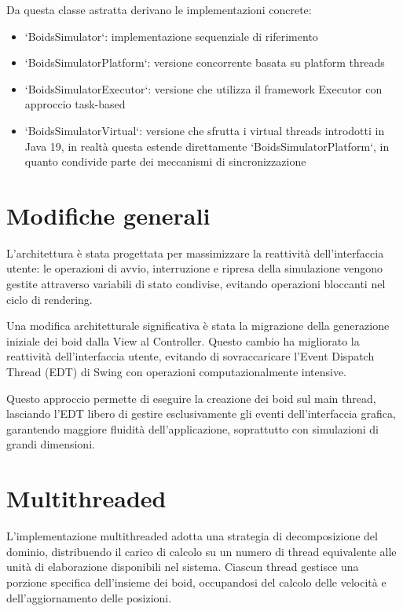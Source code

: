 \documentclass[a4paper,12pt]{report}
\begin{document}
Da questa classe astratta derivano le implementazioni concrete:
\begin{itemize}
    \item `BoidsSimulator`: implementazione sequenziale di riferimento
    \item `BoidsSimulatorPlatform`: versione concorrente basata su platform threads
    \item `BoidsSimulatorExecutor`: versione che utilizza il framework Executor con approccio task-based
    \item `BoidsSimulatorVirtual`: versione che sfrutta i virtual threads introdotti in Java 19, in realtà questa estende direttamente `BoidsSimulatorPlatform`, in quanto condivide parte dei meccanismi di sincronizzazione
\end{itemize}

\section{Modifiche generali}

L'architettura è stata progettata per massimizzare la reattività dell'interfaccia utente: le operazioni di avvio, interruzione e ripresa della simulazione vengono gestite attraverso variabili di stato condivise, evitando operazioni bloccanti nel ciclo di rendering.

Una modifica architetturale significativa è stata la migrazione della generazione iniziale dei boid dalla View al Controller. Questo cambio ha migliorato la reattività dell'interfaccia utente, evitando di sovraccaricare l'Event Dispatch Thread (EDT) di Swing con operazioni computazionalmente intensive.

Questo approccio permette di eseguire la creazione dei boid sul main thread, lasciando l'EDT libero di gestire esclusivamente gli eventi dell'interfaccia grafica, garantendo maggiore fluidità dell'applicazione, soprattutto con simulazioni di grandi dimensioni.

\section{Multithreaded}
L'implementazione multithreaded adotta una strategia di decomposizione del dominio, distribuendo il carico di calcolo su un numero di thread equivalente alle unità di elaborazione disponibili nel sistema. Ciascun thread gestisce una porzione specifica dell'insieme dei boid, occupandosi del calcolo delle velocità e dell'aggiornamento delle posizioni.
\end{document}
